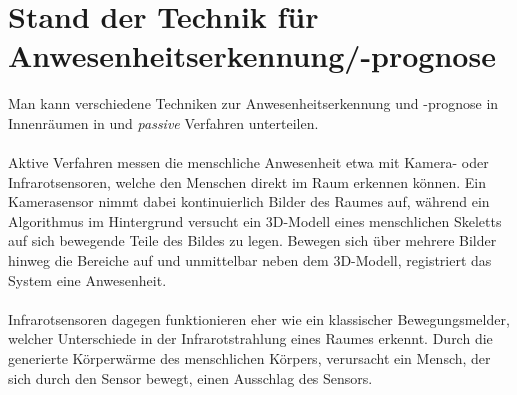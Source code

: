 \clearpage
\chapter{\textbf{Stand der Technik für Anwesenheitserkennung/-prognose}}\label{grundlagen}

Man kann verschiedene Techniken zur Anwesenheitserkennung und -prognose in Innenräumen in  und
\textit{passive} Verfahren unterteilen. \\\\
Aktive Verfahren messen die menschliche Anwesenheit etwa mit 
Kamera- oder Infrarotsensoren, welche den Menschen direkt im Raum erkennen können. Ein Kamerasensor nimmt
dabei kontinuierlich Bilder des Raumes auf, während ein Algorithmus im Hintergrund versucht ein 3D-Modell 
eines menschlichen Skeletts auf sich bewegende Teile des Bildes zu legen. Bewegen sich über mehrere Bilder 
hinweg die Bereiche auf und unmittelbar neben dem 3D-Modell, registriert das System eine Anwesenheit.\\\\
Infrarotsensoren dagegen funktionieren eher wie ein klassischer Bewegungsmelder, welcher Unterschiede in der 
Infrarotstrahlung eines Raumes erkennt. Durch die generierte Körperwärme des menschlichen Körpers, verursacht 
ein Mensch, der sich durch den Sensor bewegt, einen Ausschlag des Sensors.\\


